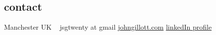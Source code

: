 \documentclass[]{friggeri-cv-a4} %
\begin{document}

\begin{aside} %
\section{contact}
Manchester
UK
~
jsgtwenty at gmail
\href{https://www.johngillott.com/}{johngillott.com}
\href{https://www.linkedin.com/in/johngillott/}{linkedIn profile}
\end{aside}
\end{document}
